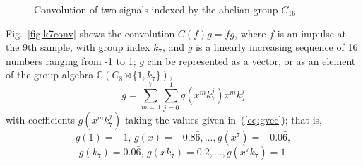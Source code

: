 \documentclass[reqno,onecolumn,oneside]{paper}
\newcommand{\<}{\ensuremath{\langle}}
\renewcommand{\>}{\ensuremath{\rangle}}
\newcommand{\sdp}{\ensuremath{\rtimes}}
\newcommand{\field}[1]{\ensuremath{\mathbb{#1}}}
\newcommand{\C}{\field{C}}                   %
\begin{document}
\begin{figure}
\centerline{}
\caption{Convolution of two signals indexed by the abelian
  group $C_{16}$.}
\label{fig:C16conv}
\end{figure}

Fig.~\ref{fig:k7conv} shows the convolution $C(f)g = fg$,
where $f$ is an impulse at the 9th sample, with group index $k_7$, and
$g$ is a linearly increasing sequence of 16 numbers ranging
from -1 to 1; $g$ can be represented as a vector,
or as an element of the group algebra $\C(C_8 \sdp \{1, k_7\})$,
\[
g = \sum_{m=0}^7 \sum_{j=0}^1 g(x^mk_7^j) x^mk_7^j
\]
with coefficients $g(x^mk_7^j)$ taking the values given
in~(\ref{eq:gvec}); that is,
\[
g(1)=-1, \, g(x)=-0.8\bar{6}, %
\ldots, g(x^7)=-0.0\bar{6},
\]
\[
g(k_7)=0.0\bar{6}, \, g(x k_7)=0.2, \ldots, g(x^7 k_7) = 1.
\]
\end{document}
